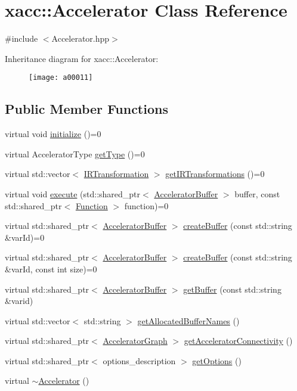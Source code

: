 \hypertarget{a00011}{}\section{xacc\+:\+:Accelerator Class Reference}
\label{a00011}


{\ttfamily \#include $<$Accelerator.\+hpp$>$}

Inheritance diagram for xacc\+:\+:Accelerator\+:\begin{figure}[H]
\begin{center}
\leavevmode
\texttt{[image: a00011]}
\end{center}
\end{figure}
\subsection*{Public Member Functions}
\begin{DoxyCompactItemize}
\item 
virtual void \hyperlink{a00011_a8cdc6f0c5a660013c29c07657a06303b}{initialize} ()=0
\item 
virtual Accelerator\+Type \hyperlink{a00011_aaffc3e4bb9880eb5041b1b58ee4c2665}{get\+Type} ()=0
\item 
virtual std\+::vector$<$ \hyperlink{a00051}{I\+R\+Transformation} $>$ \hyperlink{a00011_ad6e4a642dcb24e552675bcbeff1e1b04}{get\+I\+R\+Transformations} ()=0
\item 
virtual void \hyperlink{a00011_a89b3f3e6294f228abf03a410b0fb1674}{execute} (std\+::shared\+\_\+ptr$<$ \hyperlink{a00013}{Accelerator\+Buffer} $>$ buffer, const std\+::shared\+\_\+ptr$<$ \hyperlink{a00038}{Function} $>$ function)=0
\item 
virtual std\+::shared\+\_\+ptr$<$ \hyperlink{a00013}{Accelerator\+Buffer} $>$ \hyperlink{a00011_aab5046e8d83ab390302e0f49533e95fc}{create\+Buffer} (const std\+::string \&var\+Id)=0
\item 
virtual std\+::shared\+\_\+ptr$<$ \hyperlink{a00013}{Accelerator\+Buffer} $>$ \hyperlink{a00011_a064a2dbd58338364115c260267806945}{create\+Buffer} (const std\+::string \&var\+Id, const int size)=0
\item 
virtual std\+::shared\+\_\+ptr$<$ \hyperlink{a00013}{Accelerator\+Buffer} $>$ \hyperlink{a00011_ab3820be326e28a553fed1a824f4d41d0}{get\+Buffer} (const std\+::string \&varid)
\item 
virtual std\+::vector$<$ std\+::string $>$ \hyperlink{a00011_ae1463d7e405df89fa4af47e8922f4b82}{get\+Allocated\+Buffer\+Names} ()
\item 
virtual std\+::shared\+\_\+ptr$<$ \hyperlink{a00043}{Accelerator\+Graph} $>$ \hyperlink{a00011_adfed940ce1fa476b009344ddf5a4bbc3}{get\+Accelerator\+Connectivity} ()
\item 
virtual std\+::shared\+\_\+ptr$<$ options\+\_\+description $>$ \hyperlink{a00011_a98c9eda6b54367c75667ecfbbf167979}{get\+Options} ()
\item 
virtual \hyperlink{a00011_aed88ab0d71b765f0b0f512684ccd4b55}{$\sim$\+Accelerator} ()
\end{DoxyCompactItemize}
